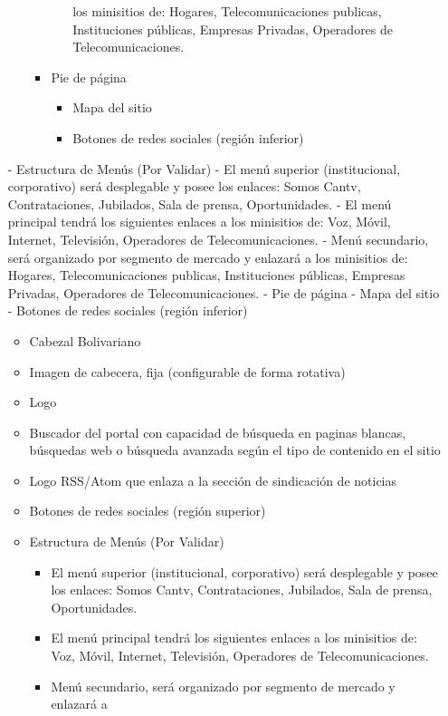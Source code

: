 \documentclass[11pt, letterpaper, oneside, spanish]{scrbook}
\begin{document}
\begin{itemize}
\begin{itemize}
\begin{itemize}
\begin{itemize}
       los minisitios de: Hogares, Telecomunicaciones publicas, Instituciones
       públicas, Empresas Privadas, Operadores de Telecomunicaciones.
\end{itemize}
\item Pie de página
\begin{itemize}
\item Mapa del sitio
\item Botones de redes sociales (región inferior)
\end{itemize}
\end{itemize}
\end{itemize}
- Estructura de Menús (Por Validar)
     - El menú superior (institucional, corporativo) será desplegable y posee
       los enlaces: Somos Cantv, Contrataciones, Jubilados, Sala de prensa,
       Oportunidades.
     - El menú principal tendrá los siguientes enlaces a los minisitios de:
       Voz, Móvil, Internet, Televisión, Operadores de Telecomunicaciones.
     - Menú secundario, será organizado por segmento de mercado y enlazará a
       los minisitios de: Hogares, Telecomunicaciones publicas, Instituciones
       públicas, Empresas Privadas, Operadores de Telecomunicaciones.
   - Pie de página
     - Mapa del sitio
     - Botones de redes sociales (región inferior)
\begin{itemize}
\item Cabezal Bolivariano
\item Imagen de cabecera, fija (configurable de forma rotativa)
\item Logo
\item Buscador del portal con capacidad de búsqueda en paginas blancas,
      búsquedas web o búsqueda avanzada según el tipo de contenido en el sitio
\item Logo RSS/Atom que enlaza a la sección de sindicación de noticias
\item Botones de redes sociales (región superior)
\item Estructura de Menús (Por Validar)
\begin{itemize}
\item El menú superior (institucional, corporativo) será desplegable y posee
       los enlaces: Somos Cantv, Contrataciones, Jubilados, Sala de prensa,
       Oportunidades.
\item El menú principal tendrá los siguientes enlaces a los minisitios de:
       Voz, Móvil, Internet, Televisión, Operadores de Telecomunicaciones.
\item Menú secundario, será organizado por segmento de mercado y enlazará a

\end{itemize}
\end{itemize}
\end{itemize}
\end{document}
